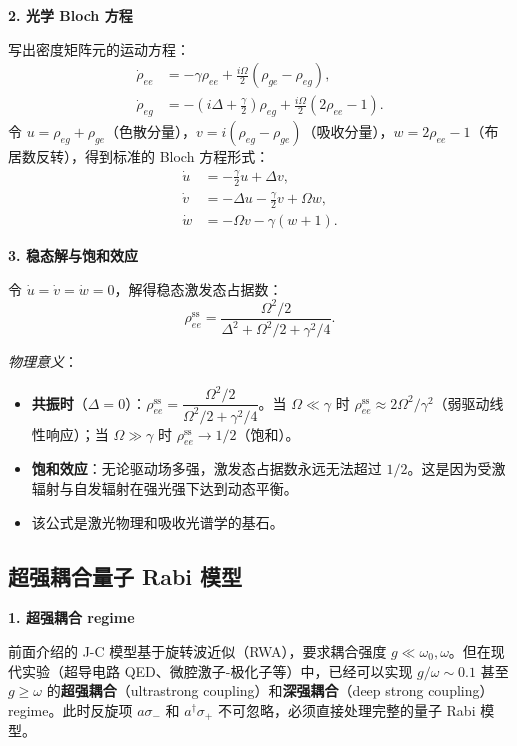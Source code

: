 \textbf{2. 光学 Bloch 方程}

写出密度矩阵元的运动方程：
\begin{align*}
\dot{\rho}_{ee} &= -\gamma\rho_{ee} + \frac{i\Omega}{2}(\rho_{ge}-\rho_{eg}), \\
\dot{\rho}_{eg} &= -(i\Delta + \frac{\gamma}{2})\rho_{eg} + \frac{i\Omega}{2}(2\rho_{ee}-1).
\end{align*}
令 $u = \rho_{eg}+\rho_{ge}$（色散分量），$v = i(\rho_{eg}-\rho_{ge})$（吸收分量），$w = 2\rho_{ee}-1$（布居数反转），得到标准的 Bloch 方程形式：
\begin{align*}
\dot{u} &= -\frac{\gamma}{2}u + \Delta v, \\
\dot{v} &= -\Delta u - \frac{\gamma}{2}v + \Omega w, \\
\dot{w} &= -\Omega v - \gamma(w+1).
\end{align*}

\textbf{3. 稳态解与饱和效应}

令 $\dot{u}=\dot{v}=\dot{w}=0$，解得稳态激发态占据数：
\[
\boxed{\rho_{ee}^{\text{ss}} = \frac{\Omega^2/2}{\Delta^2 + \Omega^2/2 + \gamma^2/4}}.
\]

\textit{物理意义}：
\begin{itemize}[nosep]
    \item \textbf{共振时}（$\Delta=0$）：$\rho_{ee}^{\text{ss}} = \dfrac{\Omega^2/2}{\Omega^2/2 + \gamma^2/4}$。当 $\Omega\ll\gamma$ 时 $\rho_{ee}^{\text{ss}}\approx 2\Omega^2/\gamma^2$（弱驱动线性响应）；当 $\Omega\gg\gamma$ 时 $\rho_{ee}^{\text{ss}}\to 1/2$（饱和）。
    \item \textbf{饱和效应}：无论驱动场多强，激发态占据数永远无法超过 $1/2$。这是因为受激辐射与自发辐射在强光强下达到动态平衡。
    \item 该公式是激光物理和吸收光谱学的基石。
\end{itemize}

\subsection{超强耦合量子 Rabi 模型}

\textbf{1. 超强耦合 regime}

前面介绍的 J-C 模型基于旋转波近似（RWA），要求耦合强度 $g \ll \omega_0, \omega$。但在现代实验（超导电路 QED、微腔激子-极化子等）中，已经可以实现 $g/\omega \sim 0.1$ 甚至 $g \ge \omega$ 的\textbf{超强耦合}（ultrastrong coupling）和\textbf{深强耦合}（deep strong coupling） regime。此时反旋项 $a\sigma_-$ 和 $a^\dagger\sigma_+$ 不可忽略，必须直接处理完整的量子 Rabi 模型。

